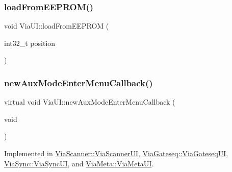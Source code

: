 \mbox{\label{class_via_u_i_aecfaa511595dcab4d38caff73abdd54b}} 
\subsubsection{\texorpdfstring{load\+From\+E\+E\+P\+R\+O\+M()}{loadFromEEPROM()}}
{\footnotesize\ttfamily void Via\+U\+I\+::load\+From\+E\+E\+P\+R\+OM (\begin{DoxyParamCaption}\item[{int32\+\_\+t}]{position }\end{DoxyParamCaption})}

\mbox{\label{class_via_u_i_a6fdbe125cd3652807631631edc636d39}} 
\subsubsection{\texorpdfstring{new\+Aux\+Mode\+Enter\+Menu\+Callback()}{newAuxModeEnterMenuCallback()}}
{\footnotesize\ttfamily virtual void Via\+U\+I\+::new\+Aux\+Mode\+Enter\+Menu\+Callback (\begin{DoxyParamCaption}\item[{void}]{ }\end{DoxyParamCaption})\hspace{0.3cm}{\ttfamily [pure virtual]}}



Implemented in \mbox{\hyperlink{class_via_scanner_1_1_via_scanner_u_i_a8176484cc1deb6df08abfe1f0c1f789f}{Via\+Scanner\+::\+Via\+Scanner\+UI}}, \mbox{\hyperlink{class_via_gateseq_1_1_via_gateseq_u_i_ad6fb8d3cdf019a290c82a9d42f3f83a7}{Via\+Gateseq\+::\+Via\+Gateseq\+UI}}, \mbox{\hyperlink{class_via_sync_1_1_via_sync_u_i_a842b231f8014209b4e96b3b8c06b16e1}{Via\+Sync\+::\+Via\+Sync\+UI}}, and \mbox{\hyperlink{class_via_meta_1_1_via_meta_u_i_a5a1034beff03b3c5cdc12a9b3a7d0834}{Via\+Meta\+::\+Via\+Meta\+UI}}.

\mbox{\label{class_via_u_i_a104b7dbb35cab9ac82b61f364052dc07}} 
